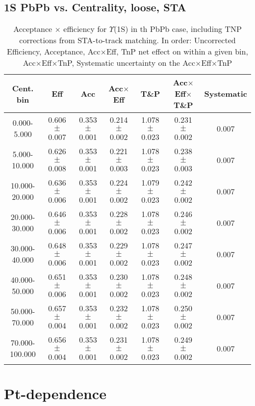 \subsection{1S PbPb vs. Centrality, loose, STA}

\begin{table}[h]
\begin{center}
\begin{tabular}{|c|c|c|c|c|c|c|}
\hline
Cent. bin& Eff & Acc & Acc$\times$Eff & T\&P & Acc$\times$Eff$\times$T\&P  & Systematic \\
\hline 
0.000-5.000 & 0.606 $\pm$ 0.007 & 0.353 $\pm$ 0.001 & 0.214 $\pm$ 0.002 & 1.078 $\pm$ 0.023 & 0.231 $\pm$ 0.002 & 0.007 \\
5.000-10.000 & 0.626 $\pm$ 0.008 & 0.353 $\pm$ 0.001 & 0.221 $\pm$ 0.003 & 1.078 $\pm$ 0.023 & 0.238 $\pm$ 0.003 & 0.007 \\
10.000-20.000 & 0.636 $\pm$ 0.006 & 0.353 $\pm$ 0.001 & 0.224 $\pm$ 0.002 & 1.079 $\pm$ 0.023 & 0.242 $\pm$ 0.002 & 0.007 \\
20.000-30.000 & 0.646 $\pm$ 0.006 & 0.353 $\pm$ 0.001 & 0.228 $\pm$ 0.002 & 1.078 $\pm$ 0.023 & 0.246 $\pm$ 0.002 & 0.007 \\
30.000-40.000 & 0.648 $\pm$ 0.006 & 0.353 $\pm$ 0.001 & 0.229 $\pm$ 0.002 & 1.078 $\pm$ 0.023 & 0.247 $\pm$ 0.002 & 0.007 \\
40.000-50.000 & 0.651 $\pm$ 0.006 & 0.353 $\pm$ 0.001 & 0.230 $\pm$ 0.002 & 1.078 $\pm$ 0.023 & 0.248 $\pm$ 0.002 & 0.007 \\
50.000-70.000 & 0.657 $\pm$ 0.004 & 0.353 $\pm$ 0.001 & 0.232 $\pm$ 0.002 & 1.078 $\pm$ 0.023 & 0.250 $\pm$ 0.002 & 0.007 \\
70.000-100.000 & 0.656 $\pm$ 0.004 & 0.353 $\pm$ 0.001 & 0.231 $\pm$ 0.002 & 1.078 $\pm$ 0.023 & 0.249 $\pm$ 0.002 & 0.007 \\
\hline                           
\end{tabular}
\caption{Acceptance $\times$ efficiency for $\Upsilon$(1S) in th PbPb
case, including TNP corrections from STA-to-track matching. In order: Uncorrected Efficiency, Acceptance, Acc$\times$Eff,
TnP net effect on within a given bin, Acc$\times$Eff$\times$TnP,
Systematic uncertainty on the  Acc$\times$Eff$\times$TnP }
\label{Aet_1S_pyquen_cent2014_STA}
\end{center}
\end{table}


\section{Pt-dependence}

